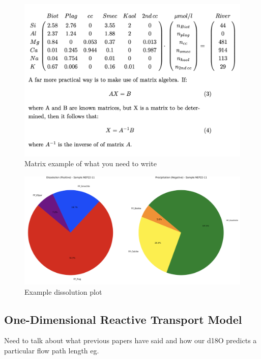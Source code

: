 \begin{figure}[h]
    \centering
    \includegraphics[width=\textwidth]{matrix_eg.png}
    \caption{Matrix example of what you need to write}
    \label{fig:discussion5}
\end{figure}

\FloatBarrier


\begin{figure}[h]
    \centering
    \includegraphics[width=\textwidth]{Stoichiometric_eg.png}
    \caption{Example dissolution plot}
    \label{fig:discussion6}
\end{figure}

\FloatBarrier





\subsection{One-Dimensional Reactive Transport Model}


Need to talk about what previous papers have said and how our d18O predicts a particular flow path length eg.

